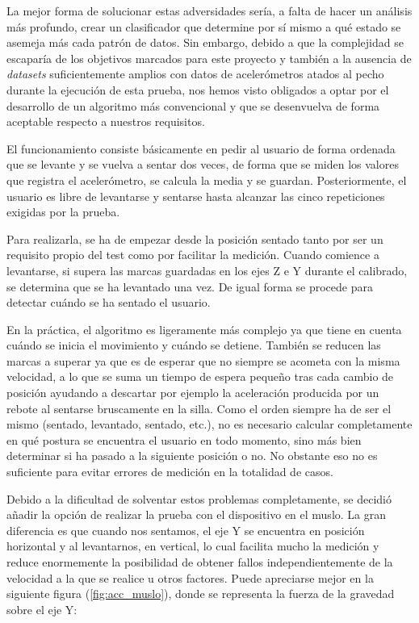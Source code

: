 La mejor forma de solucionar estas adversidades sería, a falta de hacer un análisis más profundo, crear un clasificador que determine por sí mismo a qué estado se asemeja más cada patrón de datos. Sin embargo, debido a que la complejidad se escaparía de los objetivos marcados para este proyecto y también a la ausencia de \textit{datasets} suficientemente amplios con datos de acelerómetros atados al pecho durante la ejecución de esta prueba, nos hemos visto obligados a optar por el desarrollo de un algoritmo más convencional y que se desenvuelva de forma aceptable respecto a nuestros requisitos.

El funcionamiento consiste básicamente en pedir al usuario de forma ordenada que se levante y se vuelva a sentar dos veces, de forma que se miden los valores que registra el acelerómetro, se calcula la media y se guardan. Posteriormente, el usuario es libre de levantarse y sentarse hasta alcanzar las cinco repeticiones exigidas por la prueba. 

Para realizarla, se ha de empezar desde la posición sentado tanto por ser un requisito propio del test como por facilitar la medición. Cuando comience a levantarse, si supera las marcas guardadas en los ejes Z e Y durante el calibrado, se determina que se ha levantado una vez. De igual forma se procede para detectar cuándo se ha sentado el usuario.

En la práctica, el algoritmo es ligeramente más complejo ya que tiene en cuenta cuándo se inicia el movimiento y cuándo se detiene. También se reducen las marcas a superar ya que es de esperar que no siempre se acometa con la misma velocidad, a lo que se suma un tiempo de espera pequeño tras cada cambio de posición ayudando a descartar por ejemplo la aceleración producida por un rebote al sentarse bruscamente en la silla. Como el orden siempre ha de ser el mismo (sentado, levantado, sentado, etc.), no es necesario calcular completamente en qué postura se encuentra el usuario en todo momento, sino más bien determinar si ha pasado a la siguiente posición o no. No obstante eso no es suficiente para evitar errores de medición en la totalidad de casos.

Debido a la dificultad de solventar estos problemas completamente, se decidió añadir la opción de realizar la prueba con el dispositivo en el muslo. La gran diferencia es que cuando nos sentamos, el eje Y se encuentra en posición horizontal y al levantarnos, en vertical, lo cual facilita mucho la medición y reduce enormemente la posibilidad de obtener fallos independientemente de la velocidad a la que se realice u otros factores. Puede apreciarse mejor en la siguiente figura (\ref{fig:acc_muslo}), donde se representa la fuerza de la gravedad sobre el eje Y:

